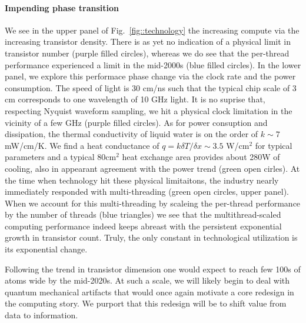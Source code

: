 \documentclass{article}
\begin{document}
\paragraph{Impending phase transition}
We see in the upper panel of Fig.~\ref{fig::technology} the increasing compute via the increasing transistor density.
There is as yet no indication of a physical limit in transistor number (purple filled circles), whereas we do see that the per-thread performance experienced a limit in the mid-2000s (blue filled circles).
In the lower panel, we explore this performace phase change via the clock rate and the power consumption.
The speed of light is 30 cm/ns such that the typical chip scale of 3 cm corresponds to one wavelength of 10 GHz light.
It is no suprise that, respecting Nyquist waveform sampling, we hit a physical clock limitation in the vicinity of a few GHz (purple filled circles).
As for power consuption and dissipation, the thermal conductivity of liquid water is on the order of $k \sim 7 $mW/cm/K.
We find a heat conductance of $q = k \delta T / \delta x \sim 3.5$ W/cm$^2$ for typical parameters and a typical 80cm$^2$ heat exchange area provides about 280W of cooling, also in appearant agreement with the power trend (green open cirles).
At the time when technology hit these physical limitaitons, the industry nearly immediately responded with multi-threading (green open circles, upper panel).
When we account for this multi-threading by scaleing the per-thread performance by the number of threads (blue triangles) we see that the multithread-scaled computing performance indeed keeps abreast with the persistent exponential growth in transistor count.
Truly, the only constant in technological utilization is its exponential change.


Following the trend in transistor dimension one would expect to reach few 100s of atoms wide by the mid-2020s.
At such a scale, we will likely begin to deal with quantum mechanical artifacts that would once again motivate a core redesign in the computing story.
We purport that this redesign will be to shift value from data to information.
\end{document}
